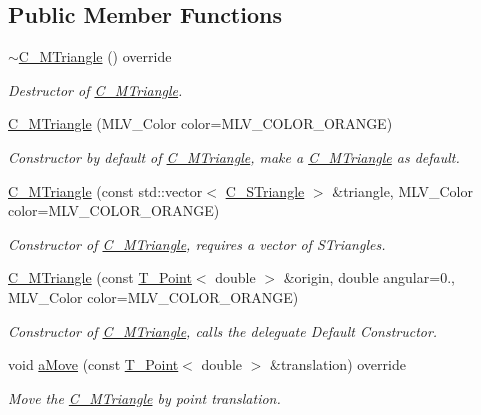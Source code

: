 \subsection*{Public Member Functions}
\begin{DoxyCompactItemize}
\item 
\hyperlink{classC__MTriangle_afec9368409c7a8bfd03cd0e735e1eee7}{$\sim$\+C\+\_\+\+M\+Triangle} () override
\begin{DoxyCompactList}\small\item\em Destructor of \hyperlink{classC__MTriangle}{C\+\_\+\+M\+Triangle}. \end{DoxyCompactList}\item 
\hyperlink{classC__MTriangle_ae9ead057d38f3e16948825353c5e31d6}{C\+\_\+\+M\+Triangle} (M\+L\+V\+\_\+\+Color color=M\+L\+V\+\_\+\+C\+O\+L\+O\+R\+\_\+\+O\+R\+A\+N\+GE)
\begin{DoxyCompactList}\small\item\em Constructor by default of \hyperlink{classC__MTriangle}{C\+\_\+\+M\+Triangle}, make a \hyperlink{classC__MTriangle}{C\+\_\+\+M\+Triangle} as default. \end{DoxyCompactList}\item 
\hyperlink{classC__MTriangle_a1a628c318d5b8982d5efa904e105ce10}{C\+\_\+\+M\+Triangle} (const std\+::vector$<$ \hyperlink{classC__STriangle}{C\+\_\+\+S\+Triangle} $>$ \&triangle, M\+L\+V\+\_\+\+Color color=M\+L\+V\+\_\+\+C\+O\+L\+O\+R\+\_\+\+O\+R\+A\+N\+GE)
\begin{DoxyCompactList}\small\item\em Constructor of \hyperlink{classC__MTriangle}{C\+\_\+\+M\+Triangle}, requires a vector of S\+Triangles. \end{DoxyCompactList}\item 
\hyperlink{classC__MTriangle_a5a8ffada7ee743f463304b1093394404}{C\+\_\+\+M\+Triangle} (const \hyperlink{classT__Point}{T\+\_\+\+Point}$<$ double $>$ \&origin, double angular=0., M\+L\+V\+\_\+\+Color color=M\+L\+V\+\_\+\+C\+O\+L\+O\+R\+\_\+\+O\+R\+A\+N\+GE)
\begin{DoxyCompactList}\small\item\em Constructor of \hyperlink{classC__MTriangle}{C\+\_\+\+M\+Triangle}, calls the deleguate Default Constructor. \end{DoxyCompactList}\item 
void \hyperlink{classC__MTriangle_a4e185345e7e1ffd5c0b7f1f8dfdbdc59}{a\+Move} (const \hyperlink{classT__Point}{T\+\_\+\+Point}$<$ double $>$ \&translation) override
\begin{DoxyCompactList}\small\item\em Move the \hyperlink{classC__MTriangle}{C\+\_\+\+M\+Triangle} by point translation. \end{DoxyCompactList}\item 

\end{DoxyCompactItemize}

